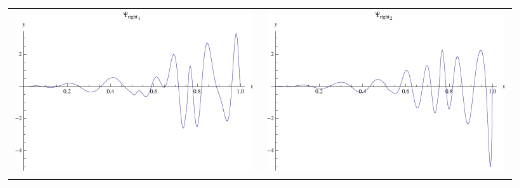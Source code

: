 \documentclass{article}
\begin{document}
\begin{landscape}
\begin{tabular}{cc}
\includegraphics[width=10.cm]{decic_wavelet_dright_1.pdf}& \includegraphics[width=10.cm]{decic_wavelet_dright_2.pdf} \\
\end{tabular} 
 \end{landscape}
\end{document}
